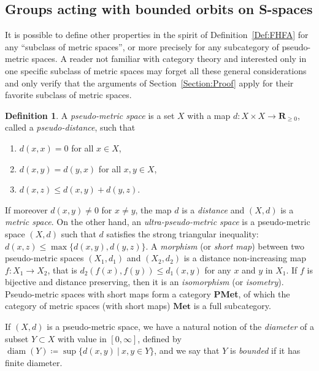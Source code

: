 \documentclass[a4paper]{article}
\theoremstyle{definition}
\newtheorem{defn}[lem]{Definition}
\DeclareMathOperator\diam{diam}
\newcommand*{\field}[1]{\mathbf{#1}}
\newcommand*{\category}[1]{\textbf{#1}}
\newcommand*{\PMet}{\category{PMet}}
\newcommand*{\CatS}{\category{S}}
\newcommand*{\R}{\field{R}}
\newcommand{\setst}[2]{\{#1\ |\ #2\}}
\begin{document}
\subsection{Groups acting with bounded orbits on \CatS-spaces}\label{SubSec:CatS}
It is possible to define other properties in the spirit of Definition~\ref{Def:FHFA} for any ``subclass of metric spaces'', or more precisely for any subcategory of pseudo-metric spaces.
A reader not familiar with category theory and interested only in one specific subclass of metric spaces may forget all these general considerations and only verify that the arguments of Section~\ref{Section:Proof} apply for their favorite subclass of metric spaces.
%
%
\begin{defn}\label{Def:Distance}
A \emph{pseudo-metric space} is a set $X$ with a map $d\colon X\times X\to \R_{\geq0}$, called a \emph{pseudo-distance}, such that
\begin{enumerate}
\item $d(x,x)=0$ for all $x\in X$,
\item $d(x,y)=d(y,x)$ for all $x,y \in X$,
\item $d(x,z)\leq d(x,y)+d(y,z)$.
\end{enumerate}
\end{defn}
%
%
If moreover $d(x,y)\neq 0$ for $x\neq y$, the map $d$ is a \emph{distance} and $(X,d)$ is a \emph{metric space}.
On the other hand, an \emph{ultra-pseudo-metric space} is a pseudo-metric space $(X,d)$ such that $d$ satisfies the strong triangular inequality: $d(x,z)\leq \max\{d(x,y),d(y,z)\}$.
A \emph{morphism} (or \emph{short map}) between two pseudo-metric spaces $(X_1,d_1)$ and $(X_2,d_2)$ is a distance non-increasing map $f\colon X_1\to X_2$, that is $d_2(f(x),f(y))\leq d_1(x,y)$ for any $x$ and $y$ in $X_1$.
If $f$ is bijective and distance preserving, then it is an \emph{isomorphism} (or \emph{isometry}).
Pseudo-metric spaces with short maps form a category \PMet, of which the category of metric spaces (with short maps) $\category{Met}$ is a full subcategory.

If $(X,d)$ is a pseudo-metric space, we have a natural notion of the  \emph{diameter} of a subset $Y\subset X$ with value in $[0,\infty]$, defined by $\diam(Y)\coloneqq\sup\setst{d(x,y)}{x,y\in Y}$, and we say that $Y$ is \emph{bounded} if it has finite diameter.
%
%
\end{document}
